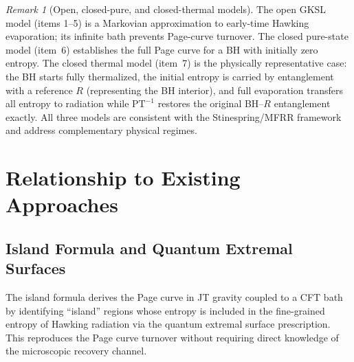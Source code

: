 \documentclass[11pt,twocolumn]{article}
\theoremstyle{remark}
\newtheorem{remark}[theorem]{Remark}
\begin{document}
\begin{center}
\end{center}

\begin{remark}[Open, closed-pure, and closed-thermal models]
The open GKSL model (items 1--5) is a Markovian approximation to early-time
Hawking evaporation; its infinite bath prevents Page-curve turnover. The
closed pure-state model (item~6) establishes the full Page curve for a BH
with initially zero entropy. The closed thermal model (item~7) is the
physically representative case: the BH starts fully thermalized, the initial
entropy is carried by entanglement with a reference $R$ (representing the BH
interior), and full evaporation transfers all entropy to radiation while
$\mathrm{PT}^{-1}$ restores the original BH--$R$ entanglement exactly. All
three models are consistent with the Stinespring/MFRR framework and address
complementary physical regimes.
\end{remark}

\section{Relationship to Existing Approaches}
\label{sec:comparison}

\subsection{Island Formula and Quantum Extremal Surfaces}

The island formula \cite{Penington2020,AlmheiriEngelhartsMarolfMaxfield2019}
derives the Page curve in JT gravity coupled to a CFT bath by identifying
``island'' regions whose entropy is included in the fine-grained entropy
of Hawking radiation via the quantum extremal surface prescription. This
reproduces the Page curve turnover without requiring direct knowledge of
the microscopic recovery channel.
\end{document}
